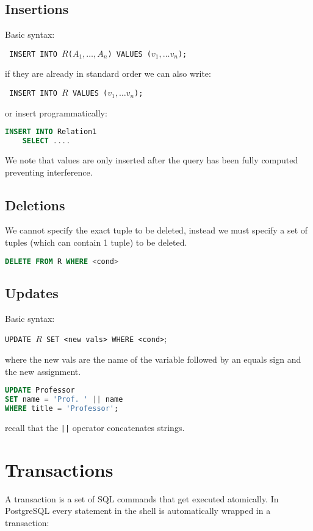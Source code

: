 \documentclass{sciposter}
\renewcommand{\t}[1]{\texttt{#1}}
\begin{document}
\begin{multicols}{3}
\subsection*{Insertions}

Basic syntax:

\texttt{
INSERT INTO $R$($A_1,\ldots,A_n$) VALUES ($v_1,\ldots v_n$);
}

if they are already in standard order we can also write:

\texttt{
	INSERT INTO $R$ VALUES ($v_1,\ldots v_n$);
}

or insert programmatically:

\begin{lstlisting}[language=SQL]
INSERT INTO Relation1
	SELECT ....
\end{lstlisting}

We note that values are only inserted after the query has been fully computed preventing interference.

\subsection*{Deletions}
We cannot specify the exact tuple to be deleted, instead we must specify a set of tuples (which can contain 1 tuple) to be deleted.
\begin{lstlisting}[language=SQL]
DELETE FROM R WHERE <cond>
\end{lstlisting}

\subsection*{Updates}
Basic syntax:

\texttt{UPDATE $R$ SET <new vals> WHERE <cond>};

where the new vals are the name of the variable followed by an equals sign and the new assignment. 
\begin{lstlisting}[language=SQL]
UPDATE Professor
SET name = 'Prof. ' || name
WHERE title = 'Professor';
\end{lstlisting}
recall that the \t{||} operator concatenates strings.


\section*{Transactions}


A transaction is a set of SQL commands that get executed atomically. In PostgreSQL every statement in the shell is automatically wrapped in a transaction:


\end{multicols}
\end{document}
